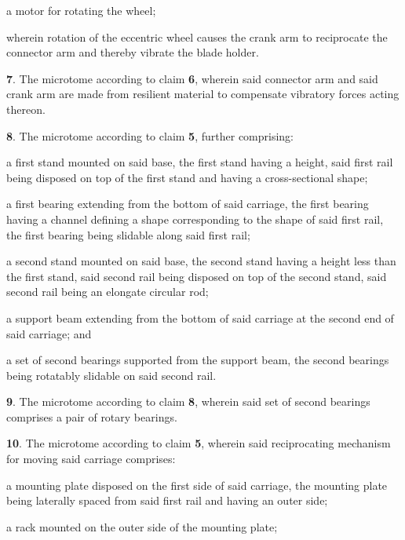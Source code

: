 \documentclass{article}
\begin{document}
\begin{hangpars}
\hspace*{1.5em}a motor for rotating the wheel;

\hspace*{1.5em}wherein rotation of the eccentric wheel causes the crank arm to reciprocate the connector arm and thereby vibrate the blade holder.

\textbf{7}. The microtome according to claim \textbf{6}, wherein said connector arm and said crank arm are made from resilient material to compensate vibratory forces acting thereon.

\textbf{8}. The microtome according to claim \textbf{5}, further comprising:

\hspace*{1.5em}a first stand mounted on said base, the first stand having a height, said first rail being disposed on top of the first stand and having a cross-sectional shape;

\hspace*{1.5em}a first bearing extending from the bottom of said carriage, the first bearing having a channel defining a shape corresponding to the shape of said first rail, the first bearing being slidable along said first rail;

\hspace*{1.5em}a second stand mounted on said base, the second stand having a height less than the first stand, said second rail being disposed on top of the second stand, said second rail being an elongate circular rod;

\hspace*{1.5em}a support beam extending from the bottom of said carriage at the second end of said carriage; and

\hspace*{1.5em}a set of second bearings supported from the support beam, the second bearings being rotatably slidable on said second rail.

\textbf{9}. The microtome according to claim \textbf{8}, wherein said set of second bearings comprises a pair of rotary bearings.

\textbf{10}. The microtome according to claim \textbf{5}, wherein said reciprocating mechanism for moving said carriage comprises:

\hspace*{1.5em}a mounting plate disposed on the first side of said carriage, the mounting plate being laterally spaced from said first rail and having an outer side;

\hspace*{1.5em}a rack mounted on the outer side of the mounting plate;


\end{hangpars}
\end{document}
